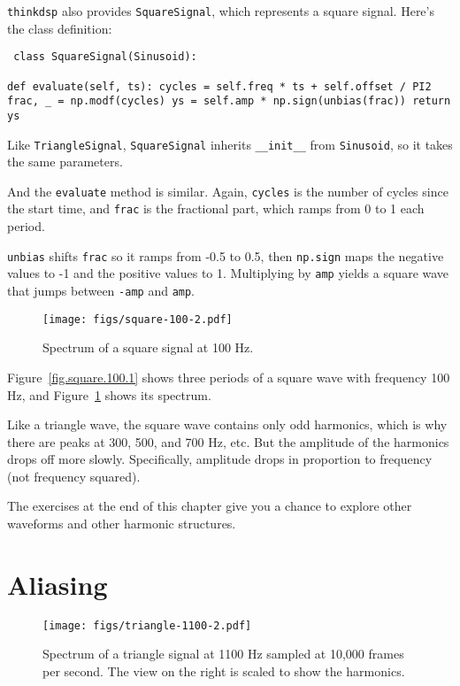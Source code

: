 \documentclass[12pt]{book} \usepackage[width=5.5in,height=8.5in, hmarginratio=3:2,vmarginratio=1:1]{geometry}
\begin{document}
{\tt thinkdsp} also provides {\tt SquareSignal}, which represents a square signal. Here's the class definition: 

\begin{verbatim} class SquareSignal(Sinusoid): 

def evaluate(self, ts): cycles = self.freq * ts + self.offset / PI2 frac, _ = np.modf(cycles) ys = self.amp * np.sign(unbias(frac)) return ys \end{verbatim} 

Like {\tt TriangleSignal}, {\tt SquareSignal} inherits \verb"__init__" from {\tt Sinusoid}, so it takes the same parameters. 

And the {\tt evaluate} method is similar. Again, {\tt cycles} is the number of cycles since the start time, and {\tt frac} is the fractional part, which ramps from 0 to 1 each period. 

{\tt unbias} shifts {\tt frac} so it ramps from -0.5 to 0.5, then {\tt np.sign} maps the negative values to -1 and the positive values to 1. Multiplying by {\tt amp} yields a square wave that jumps between {\tt -amp} and {\tt amp}. 

\begin{figure} 

\centerline{\texttt{[image: figs/square-100-2.pdf]}} \caption{Spectrum of a square signal at 100 Hz.} \label{fig.square.100.2} \end{figure} 

Figure~\ref{fig.square.100.1} shows three periods of a square wave with frequency 100 Hz, and Figure~\ref{fig.square.100.2} shows its spectrum. 

Like a triangle wave, the square wave contains only odd harmonics, which is why there are peaks at 300, 500, and 700 Hz, etc. But the amplitude of the harmonics drops off more slowly. Specifically, amplitude drops in proportion to frequency (not frequency squared). 

The exercises at the end of this chapter give you a chance to explore other waveforms and other harmonic structures. 

\section{Aliasing} \label{aliasing} 

\begin{figure} 

\centerline{\texttt{[image: figs/triangle-1100-2.pdf]}} \caption{Spectrum of a triangle signal at 1100 Hz sampled at 10,000 frames per second. The view on the right is scaled to show the harmonics.} \label{fig.triangle.1100.2} \end{figure} 
\end{document}
